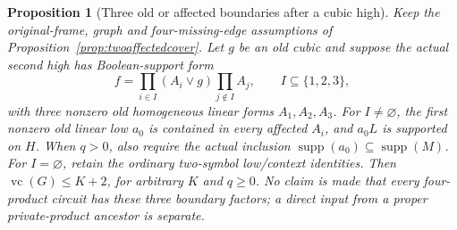 \documentclass[11pt]{article}
\newcommand{\supp}{\operatorname{supp}}
\newcommand{\vc}{\operatorname{vc}}
\newtheorem{proposition}[theorem]{Proposition}
\theoremstyle{definition}
\theoremstyle{remark}
\begin{document}
\begin{proposition}[Three old or affected boundaries after a cubic high]
\label{prop:cubicthreeboundary}
Keep the original-frame, graph and four-missing-edge assumptions of
Proposition~\ref{prop:twoaffectedcover}. Let $g$ be an old cubic and suppose
the actual second high has Boolean-support form
\[
 f=\prod_{i\in I}(A_i\vee g)\prod_{j\notin I}A_j,
 \qquad I\subseteq\{1,2,3\},
\]
with three nonzero old homogeneous linear forms $A_1,A_2,A_3$.
For $I\ne\varnothing$, the first nonzero old linear low $a_0$ is contained
in every affected $A_i$, and $a_0L$ is supported on $H$. When $q>0$,
also require the actual inclusion $\supp(a_0)\subseteq\supp(M)$.
For $I=\varnothing$, retain the ordinary two-symbol low/context identities.
Then $\vc(G)\le K+2$, for arbitrary $K$ and $q\ge0$.
No claim is made that every four-product circuit has these three boundary
factors; a direct input from a proper private-product ancestor is separate.
\end{proposition}
\end{document}
